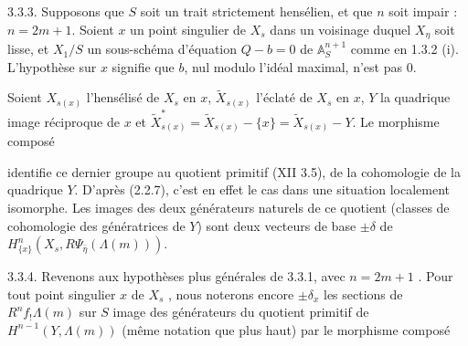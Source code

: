 3.3.3. Supposons que $S$ soit un trait strictement hensélien, et que $n$ soit impair : $n=2m+1$. Soient $x$ un point singulier de $X_s$ dans un voisinage duquel $X_\eta$ soit lisse, et $X_1/S$ un sous-schéma d'équation $Q-b=0$ de $\mathbb{A}^{n+1}_S$ comme en 1.3.2 (i). L'hypothèse sur $x$ signifie que $b$, nul modulo l'idéal maximal, n'est pas 0.

Soient $X_{s(x)}$ l'hensélisé de $X_s$ en $x$, $\widetilde{X}_{s(x)}$ l'éclaté de $X_s$ en $x$, $Y$ la quadrique image réciproque de $x$ et $\widetilde{X}^{*}_{s(x)}=\widetilde{X}_{s(x)}-\{x\}=\widetilde{X}_{s(x)}-Y$. Le morphisme composé

\begin{center}
\end{center}
identifie ce dernier groupe au quotient primitif (XII 3.5), de la cohomologie de la quadrique $Y$. D'après (2.2.7), c'est en effet le cas dans une situation localement isomorphe. Les images des deux générateurs naturels de ce quotient (classes de cohomologie des génératrices de $Y$) sont deux vecteurs de base $\pm\delta$ de $H^n_{\{x\}}(X_s,R\Psi_{\bar\eta}(\Lambda(m)))$.



3.3.4.  Revenons aux hypothèses plus générales de 3.3.1, avec $n = 2m + 1$ . Pour tout point singulier $x$ de $X_s$ , nous noterons encore $\pm \delta_x$ les sections de $R^n f_! \Lambda(m)$ sur $S$ image des générateurs du quotient primitif de $H^{n-1}(Y,\Lambda(m))$ (même notation que plus haut) par le morphisme composé

